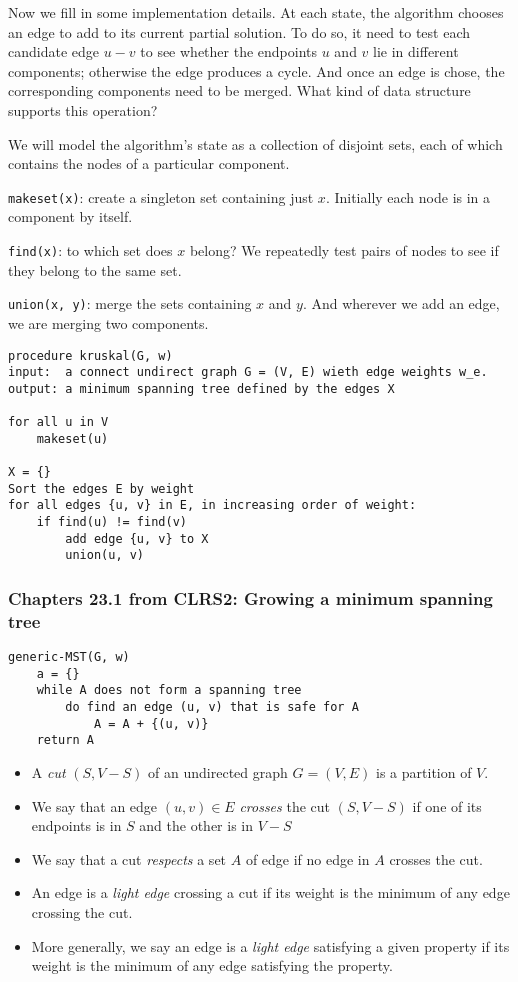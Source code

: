 \documentclass[a4paper,11pt]{article}
\begin{document}
Now we fill in some implementation details. At each state, the algorithm
chooses an edge to add to its current partial solution. To do so, it
need to test each candidate edge $u - v$ to see whether the endpoints
$u$ and $v$ lie in different components; otherwise the edge produces a
cycle. And once an edge is chose, the corresponding components need to
be merged. What kind of data structure supports this operation?

We will model the algorithm's state as a collection of disjoint sets,
each of which contains the nodes of a particular component.

\texttt{makeset(x)}: create a singleton set containing just $x$.
Initially each node is in a component by itself.

\texttt{find(x)}: to which set does $x$ belong? We repeatedly test pairs
of nodes to see if they belong to the same set.

\texttt{union(x, y)}: merge the sets containing $x$ and $y$. And
wherever we add an edge, we are merging two components.

\begin{verbatim}
procedure kruskal(G, w)
input:  a connect undirect graph G = (V, E) wieth edge weights w_e.
output: a minimum spanning tree defined by the edges X

for all u in V
    makeset(u)

X = {}
Sort the edges E by weight
for all edges {u, v} in E, in increasing order of weight:
    if find(u) != find(v)
        add edge {u, v} to X
        union(u, v)
\end{verbatim}

\subsubsection{Chapters 23.1 from CLRS2: Growing a minimum spanning
tree}\label{chapters-23.1-from-clrs2-growing-a-minimum-spanning-tree}

\begin{verbatim}
generic-MST(G, w)
    a = {}
    while A does not form a spanning tree
        do find an edge (u, v) that is safe for A
            A = A + {(u, v)}
    return A
\end{verbatim}

\begin{itemize}
\itemsep1pt\parskip0pt
\item
  A \emph{cut} $(S, V - S)$ of an undirected graph $G = (V, E)$ is a
  partition of $V$.
\item
  We say that an edge $(u, v) \in E$ \emph{crosses} the cut $(S, V - S)$
  if one of its endpoints is in $S$ and the other is in $V - S$
\item
  We say that a cut \emph{respects} a set $A$ of edge if no edge in $A$
  crosses the cut.
\item
  An edge is a \emph{light edge} crossing a cut if its weight is the
  minimum of any edge crossing the cut.
\item
  More generally, we say an edge is a \emph{light edge} satisfying a
  given property if its weight is the minimum of any edge satisfying the
  property.
\end{itemize}
\end{document}
